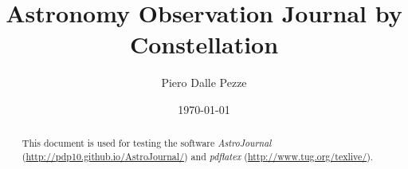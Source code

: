 \documentclass[10pt,twoside,a4paper,english]{article}
\title{Astronomy Observation Journal by Constellation}
\author{Piero Dalle Pezze}
\date{\today}
\begin{document}
\maketitle
\thispagestyle{empty}

\begin{abstract}
This document is used for testing the software {\it AstroJournal} (\href{http://pdp10.github.io/AstroJournal/}{http://pdp10.github.io/AstroJournal/}) and {\it pdflatex} (\href{http://www.tug.org/texlive/}{http://www.tug.org/texlive/}).
\end{abstract}


\tableofcontents

\clearpage
{}


\small
%
\clearpage


\small
\end{document}
